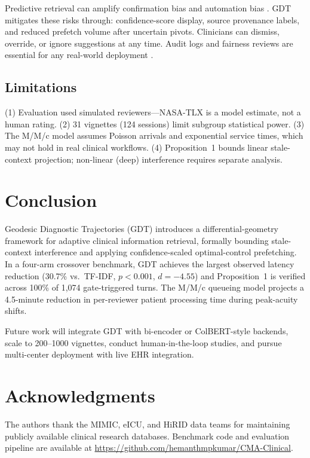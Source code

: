 \documentclass[journal,10pt,twoside]{IEEEtran}
\begin{document}
Predictive retrieval can amplify confirmation bias and automation bias \cite{croskerry2003,goddard2012}. GDT mitigates these risks through: confidence-score display, source provenance labels, and reduced prefetch volume after uncertain pivots. Clinicians can dismiss, override, or ignore suggestions at any time. Audit logs and fairness reviews are essential for any real-world deployment \cite{lekadir25,amann20}.

\subsection{Limitations}

(1) Evaluation used simulated reviewers---NASA-TLX is a model estimate, not a human rating. (2) 31 vignettes (124 sessions) limit subgroup statistical power. (3) The M/M/c model assumes Poisson arrivals and exponential service times, which may not hold in real clinical workflows. (4) Proposition~1 bounds linear stale-context projection; non-linear (deep) interference requires separate analysis.

\section{Conclusion}
\label{sec:conclusion}

Geodesic Diagnostic Trajectories (GDT) introduces a differential-geometry framework for adaptive clinical information retrieval, formally bounding stale-context interference and applying confidence-scaled optimal-control prefetching. In a four-arm crossover benchmark, GDT achieves the largest observed latency reduction (30.7\% vs.\ TF-IDF, $p{<}0.001$, $d{=}{-4.55}$) and Proposition~1 is verified across 100\% of 1,074 gate-triggered turns. The M/M/c queueing model projects a 4.5-minute reduction in per-reviewer patient processing time during peak-acuity shifts.

Future work will integrate GDT with bi-encoder or ColBERT-style \cite{khattab20} backends, scale to 200--1000 vignettes, conduct human-in-the-loop studies, and pursue multi-center deployment with live EHR integration.

\section*{Acknowledgments}

The authors thank the MIMIC, eICU, and HiRID data teams for maintaining publicly available clinical research databases. Benchmark code and evaluation pipeline are available at \url{https://github.com/hemanthmpkumar/CMA-Clinical}.



\end{document}
